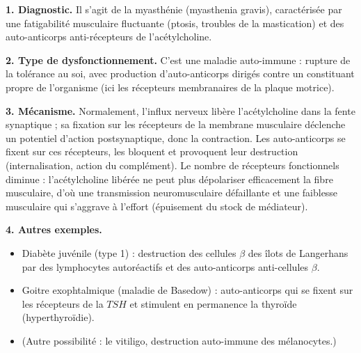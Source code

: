 \documentclass[11pt]{article}
\newcommand{\cle}[1]{{\popxbold\color{popdark}#1}}
\begin{document}
\begin{corrige}

\textbf{1. Diagnostic.} Il s'agit de la \cle{myasthénie} (myasthenia gravis), caractérisée par une fatigabilité musculaire fluctuante (ptosis, troubles de la mastication) et des auto-anticorps anti-récepteurs de l'acétylcholine.

\textbf{2. Type de dysfonctionnement.} C'est une \cle{maladie auto-immune} : rupture de la tolérance au soi, avec production d'auto-anticorps dirigés contre un constituant propre de l'organisme (ici les récepteurs membranaires de la plaque motrice).

\textbf{3. Mécanisme.} Normalement, l'influx nerveux libère l'acétylcholine dans la fente synaptique ; sa fixation sur les récepteurs de la membrane musculaire déclenche un potentiel d'action postsynaptique, donc la contraction. Les auto-anticorps se fixent sur ces récepteurs, les bloquent et provoquent leur destruction (internalisation, action du complément). Le nombre de récepteurs fonctionnels diminue : l'acétylcholine libérée ne peut plus dépolariser efficacement la fibre musculaire, d'où une transmission neuromusculaire défaillante et une faiblesse musculaire qui s'aggrave à l'effort (épuisement du stock de médiateur).

\textbf{4. Autres exemples.}
\begin{itemize}
\item \cle{Diabète juvénile} (type 1) : destruction des cellules $\beta$ des îlots de Langerhans par des lymphocytes autoréactifs et des auto-anticorps anti-cellules $\beta$.
\item \cle{Goitre exophtalmique} (maladie de Basedow) : auto-anticorps qui se fixent sur les récepteurs de la $TSH$ et stimulent en permanence la thyroïde (hyperthyroïdie).
\item (Autre possibilité : le \cle{vitiligo}, destruction auto-immune des mélanocytes.)
\end{itemize}
\end{corrige}
\end{document}
